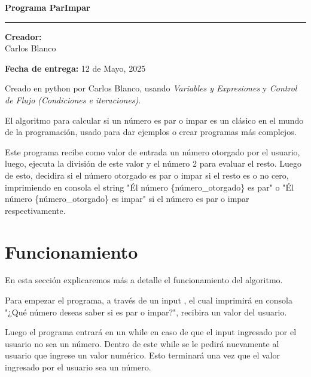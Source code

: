 \documentclass{article}
\begin{document}
\begin{center}
    {\Huge \textbf{Programa ParImpar} \par}
    \rule{80mm}{0.1mm}

    {\large \textbf{Creador:}\\\normalsize Carlos Blanco \par} 
    \medskip
    \textbf{Fecha de entrega:} 12 de Mayo, 2025
    \vspace{10pt}

\end{center}

\noindent Creado en python por Carlos Blanco, usando \textit{Variables y Expresiones} y \textit{Control de Flujo (Condiciones e iteraciones)}.

\vspace{10pt}

\noindent El algoritmo para calcular si un número es par o impar es un clásico en el mundo de la programación, usado para dar ejemplos o crear programas más complejos.

\vspace{10pt}

 \noindent Este programa recibe como valor de entrada un número  otorgado por el usuario, luego, ejecuta la división de este valor y el número 2 para evaluar el resto. Luego de esto, decidira si el número otorgado es par o impar si el resto es o no cero, imprimiendo en consola el string "Él número \{número\_otorgado\} es par" o "Él número \{número\_otorgado\} es impar" si el número es par o impar respectivamente.

\vspace{10pt}

\section*{Funcionamiento}

\noindent En esta sección explicaremos más a detalle el funcionamiento del algoritmo.

\vspace{10pt}

\noindent Para empezar el programa, a través de un input , el cual imprimirá en consola "¿Qué número deseas saber si es par o impar?", recibira un valor del usuario.

\vspace{10pt}

\noindent Luego el programa entrará en un while en caso de que el input ingresado por el usuario no sea un número. Dentro de este while se le pedirá nuevamente al usuario que ingrese un valor numérico. Esto terminará una vez que el valor ingresado por el usuario sea un número.
\end{document}
